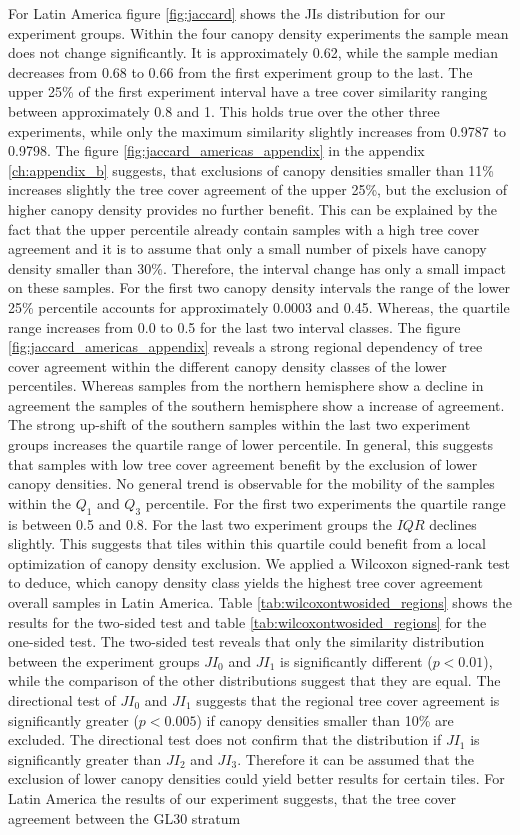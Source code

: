 			For Latin America figure \ref{fig:jaccard} shows the \acp{JI} distribution for our experiment groups. Within the four canopy density experiments the sample mean does not change significantly. It is approximately 0.62, while the sample median decreases from 0.68 to 0.66 from the first experiment group to the last. The upper 25\% of the first experiment interval have a tree cover similarity ranging between approximately 0.8 and 1. This holds true over the other three experiments, while only the maximum similarity slightly increases from 0.9787 to 0.9798. The figure \ref{fig:jaccard_americas_appendix} in the appendix \ref{ch:appendix_b} suggests, that exclusions of canopy densities smaller than 11\% increases slightly the tree cover agreement of the upper 25\%, but the exclusion of higher canopy density provides no further benefit. This can be explained by the fact that the upper percentile already contain samples with a high tree cover agreement and it is to assume that only a small number of pixels have canopy density smaller than 30\%. Therefore, the interval change has only a small impact on these samples. For the first two canopy density intervals the range of the lower 25\% percentile accounts for approximately 0.0003 and 0.45. Whereas, the quartile range increases from 0.0 to 0.5 for the last two interval classes. The figure \ref{fig:jaccard_americas_appendix} reveals a strong regional dependency of tree cover agreement within the different canopy density classes of the lower percentiles. Whereas samples from the northern hemisphere show a decline in agreement the samples of the southern hemisphere show a increase of agreement. The strong up-shift of the southern samples within the last two experiment groups increases the quartile range of lower percentile. In general, this suggests that samples with low tree cover agreement benefit by the exclusion of lower canopy densities. No general trend is observable for the mobility of the samples within the $Q_1$ and $Q_3$ percentile. For the first two experiments the quartile range is between 0.5 and 0.8. For the last two experiment groups the $IQR$ declines slightly. This suggests that tiles within this quartile could benefit from a local optimization of canopy density exclusion. We applied a Wilcoxon signed-rank test to deduce, which canopy density class yields the highest tree cover agreement overall samples in Latin America. Table \ref{tab:wilcoxontwosided_regions} shows the results for the two-sided test and table \ref{tab:wilcoxontwosided_regions} for the one-sided test. The two-sided test reveals that only the similarity distribution between the experiment groups $JI_0$ and $JI_1$ is significantly different ($p<0.01$), while the comparison of the other distributions suggest that they are equal. The directional test of $JI_0$ and $JI_1$ suggests that the regional tree cover agreement is significantly greater ($p<0.005$) if canopy densities smaller than 10\% are excluded. The directional test does not confirm that the distribution if $JI_1$ is significantly greater than $JI_2$ and $JI_3$. Therefore it can be assumed that the exclusion of lower canopy densities could yield better results for certain tiles. For Latin America the results of our experiment suggests, that the tree cover agreement between the \ac{GL30} stratum 